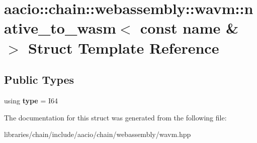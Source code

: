 \hypertarget{structaacio_1_1chain_1_1webassembly_1_1wavm_1_1native__to__wasm_3_01const_01name_01_6_01_4}{}\section{aacio\+:\+:chain\+:\+:webassembly\+:\+:wavm\+:\+:native\+\_\+to\+\_\+wasm$<$ const name \& $>$ Struct Template Reference}
\label{structaacio_1_1chain_1_1webassembly_1_1wavm_1_1native__to__wasm_3_01const_01name_01_6_01_4}
\subsection*{Public Types}
\begin{DoxyCompactItemize}
\item 
\mbox{\label{structaacio_1_1chain_1_1webassembly_1_1wavm_1_1native__to__wasm_3_01const_01name_01_6_01_4_accef6c6c09d397ebfe1f518ffc92fd53}} 
using {\bfseries type} = I64
\end{DoxyCompactItemize}


The documentation for this struct was generated from the following file\+:\begin{DoxyCompactItemize}
\item 
libraries/chain/include/aacio/chain/webassembly/wavm.\+hpp\end{DoxyCompactItemize}

